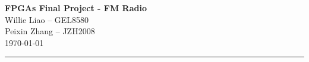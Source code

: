 \documentclass[11pt]{article}
\begin{document}
\begin{center}
    {\Large \textbf{FPGAs Final Project - FM Radio }}
    \\[10pt]
    Willie Liao \quad -- GEL8580\\[2pt]
    Peixin Zhang \quad -- JZH2008\\[2pt]
    \today
\end{center}

\vspace{8pt}
\hrule
\vspace{14pt}







\end{document}

